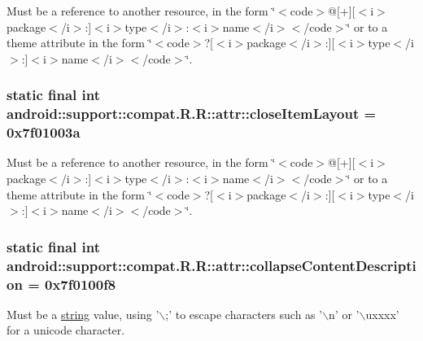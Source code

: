 Must be a reference to another resource, in the form \char`\"{}$<$code$>$@\mbox{[}+\mbox{]}\mbox{[}$<$i$>$package$<$/i$>$:\mbox{]}$<$i$>$type$<$/i$>$:$<$i$>$name$<$/i$>$$<$/code$>$\char`\"{} or to a theme attribute in the form \char`\"{}$<$code$>$?\mbox{[}$<$i$>$package$<$/i$>$:\mbox{]}\mbox{[}$<$i$>$type$<$/i$>$:\mbox{]}$<$i$>$name$<$/i$>$$<$/code$>$\char`\"{}. \hypertarget{classandroid_1_1support_1_1compat_1_1_r_1_1attr_ea9606a4313a22dc33b0e5f76c011c0f}{
\subsubsection[{closeItemLayout}]{\setlength{\rightskip}{0pt plus 5cm}static final int android::support::compat.R.R::attr::closeItemLayout = 0x7f01003a}}
\label{classandroid_1_1support_1_1compat_1_1_r_1_1attr_ea9606a4313a22dc33b0e5f76c011c0f}


Must be a reference to another resource, in the form \char`\"{}$<$code$>$@\mbox{[}+\mbox{]}\mbox{[}$<$i$>$package$<$/i$>$:\mbox{]}$<$i$>$type$<$/i$>$:$<$i$>$name$<$/i$>$$<$/code$>$\char`\"{} or to a theme attribute in the form \char`\"{}$<$code$>$?\mbox{[}$<$i$>$package$<$/i$>$:\mbox{]}\mbox{[}$<$i$>$type$<$/i$>$:\mbox{]}$<$i$>$name$<$/i$>$$<$/code$>$\char`\"{}. \hypertarget{classandroid_1_1support_1_1compat_1_1_r_1_1attr_4788421eb9f98b6aac75521e0aa89fad}{
\subsubsection[{collapseContentDescription}]{\setlength{\rightskip}{0pt plus 5cm}static final int android::support::compat.R.R::attr::collapseContentDescription = 0x7f0100f8}}
\label{classandroid_1_1support_1_1compat_1_1_r_1_1attr_4788421eb9f98b6aac75521e0aa89fad}


Must be a \hyperlink{classandroid_1_1support_1_1compat_1_1_r_1_1string}{string} value, using '$\backslash$;' to escape characters such as '$\backslash$n' or '$\backslash$uxxxx' for a unicode character. 

